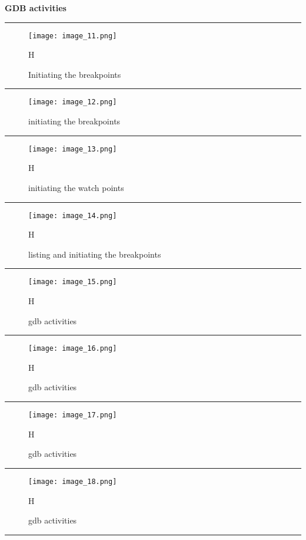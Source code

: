 \documentclass{article}
\begin{document}
\vspace{5mm}
\begin{center}
{\Large\textbf{GDB activities}}
\end{center}
\vspace{5mm}
\par\noindent\rule{\textwidth}{0.4pt}
\begin{figure}
    \centering
    \texttt{[image: image\_11.png]}
    \caption{Initiating the breakpoints}{H}
\end{figure}
\par\noindent\rule{\textwidth}{0.4pt}
\begin{figure}
    \centering
    \texttt{[image: image\_12.png]}
    \caption{initiating the breakpoints}
\end{figure}
\par\noindent\rule{\textwidth}{0.4pt}
\begin{figure}
    \centering
    \texttt{[image: image\_13.png]}
    \caption{initiating the watch points}{H}
\end{figure}
\par\noindent\rule{\textwidth}{0.4pt}
\begin{figure}
    \centering
    \texttt{[image: image\_14.png]}
    \caption{listing and initiating the breakpoints}{H}
\end{figure}
\par\noindent\rule{\textwidth}{0.4pt}
\begin{figure}
    \centering
    \texttt{[image: image\_15.png]}
    \caption{gdb activities}{H}
\end{figure}
\par\noindent\rule{\textwidth}{0.4pt}
\begin{figure}
    \centering
    \texttt{[image: image\_16.png]}
    \caption{gdb activities}{H}
\end{figure}
\par\noindent\rule{\textwidth}{0.4pt}
\begin{figure}
    \centering
    \texttt{[image: image\_17.png]}
    \caption{gdb activities}{H}
\end{figure}
\pagebreak
\par\noindent\rule{\textwidth}{0.4pt}
\begin{figure}
    \centering
    \texttt{[image: image\_18.png]}
    \caption{gdb activities}{H}
\end{figure}
\par\noindent\rule{\textwidth}{0.4pt}
\end{document}
